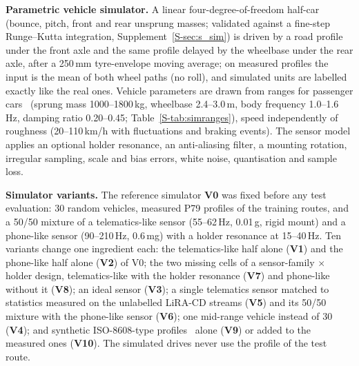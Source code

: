 \textbf{Parametric vehicle simulator.}
A linear four-degree-of-freedom half-car (bounce, pitch, front and rear unsprung masses; validated against a fine-step Runge--Kutta integration, Supplement~\ref{S-sec:s_sim}) is driven by a road profile under the front axle and the same profile delayed by the wheelbase under the rear axle, after a 250\,mm tyre-envelope moving average; on measured profiles the input is the mean of both wheel paths (no roll), and simulated units are labelled exactly like the real ones.
Vehicle parameters are drawn from ranges for passenger cars~\cite{gillespie1992} (sprung mass 1000--1800\,kg, wheelbase 2.4--3.0\,m, body frequency 1.0--1.6\,Hz, damping ratio 0.20--0.45; Table~\ref{S-tab:simranges}), speed independently of roughness (20--110\,km/h with fluctuations and braking events).
The sensor model applies an optional holder resonance, an anti-aliasing filter, a mounting rotation, irregular sampling, scale and bias errors, white noise, quantisation and sample loss.

\textbf{Simulator variants.}
The reference simulator \textbf{V0} was fixed before any test evaluation: 30 random vehicles, measured P79 profiles of the training routes, and a 50/50 mixture of a telematics-like sensor (55--62\,Hz, 0.01\,g, rigid mount) and a phone-like sensor (90--210\,Hz, 0.6\,mg) with a holder resonance at 15--40\,Hz.
Ten variants change one ingredient each: the telematics-like half alone (\textbf{V1}) and the phone-like half alone (\textbf{V2}) of V0; the two missing cells of a sensor-family $\times$ holder design, telematics-like with the holder resonance (\textbf{V7}) and phone-like without it (\textbf{V8}); an ideal sensor (\textbf{V3}); a single telematics sensor matched to statistics measured on the unlabelled LiRA-CD streams (\textbf{V5}) and its 50/50 mixture with the phone-like sensor (\textbf{V6}); one mid-range vehicle instead of 30 (\textbf{V4}); and synthetic ISO-8608-type profiles~\cite{iso8608} alone (\textbf{V9}) or added to the measured ones (\textbf{V10}).
The simulated drives never use the profile of the test route.
